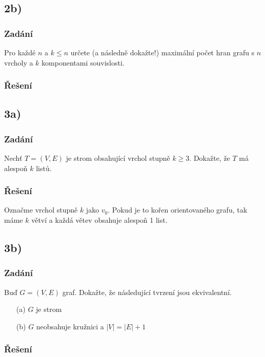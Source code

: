 \documentclass[../main.tex]{subfiles}
\begin{document}
\subsection*{2b)}
\subsubsection*{Zadání}
Pro každé $n$ a $k\leq n$ určete (a následně dokažte!) maximální počet hran grafu
s $n$ vrcholy a $k$ komponentami souvislosti.


\subsubsection*{Řešení}

\subsection*{3a)}
\subsubsection*{Zadání}
Nechť $T=(V,E)$ je strom obsahující vrchol stupně $k\geq 3$.
Dokažte, že $T$ má alespoň $k$ listů.
\subsubsection*{Řešení}

Označme vrchol stupně $k$ jako $v_0$. 
Pokud je to kořen orientovaného grafu, tak máme $k$ větví a každá větev obsahuje alespoň 1 list.



\subsection*{3b)}
\subsubsection*{Zadání}
Buď $G=(V,E)$ graf. Dokažte, že následující tvrzení jsou ekvivalentní.
\begin{enumerate}
    \item[(a)] $G$ je strom
    \item[(b)] $G$ neobsahuje kružnici a $|V| = |E| + 1$
\end{enumerate}

\subsubsection*{Řešení}
\end{document}
